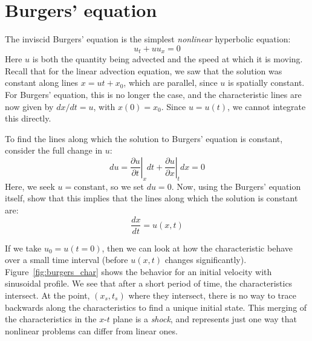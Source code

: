 

\section{Burgers' equation}

The inviscid Burgers' equation is the simplest {\em nonlinear} hyperbolic
equation:
\begin{equation}
u_t + u u_x = 0
\end{equation}
Here $u$ is both the quantity being advected and the speed at which
it is moving.  Recall that for the linear advection equation, we saw
that the solution was constant along lines $x = ut + x_0$, which are
parallel, since $u$ is spatially constant.  For Burgers' equation,
this is no longer the case, and the characteristic lines are now
given by $dx/dt = u$, with $x(0) = x_0$.  Since $u = u(t)$, we cannot
integrate this directly.

\begin{exercise}
{To find the lines along which the solution to Burgers' equation is
constant, consider the full change in $u$:
\begin{equation}
du = \left . \frac{\partial u}{\partial t} \right |_x dt +
     \left . \frac{\partial u}{\partial x} \right |_t dx = 0
\end{equation}
Here, we seek $u = \mathrm{constant}$, so we set $du = 0$.  Now,
using the Burgers' equation itself, show that this implies that
the lines along which the solution is constant are:
\begin{equation}
\frac{dx}{dt} = u(x,t)
\end{equation}
}
\end{exercise}

If we take $u_0 = u(t=0)$, then we can look at how the characteristic
behave over a small time interval (before $u(x,t)$ changes
significantly).  Figure~\ref{fig:burgers_char} shows the behavior for
an initial velocity with sinusoidal profile.  We see that after a
short period of time, the characteristics intersect.  At the point,
$(x_s, t_s)$ where they intersect, there is no way to trace backwards
along the characteristics to find a unique initial state.  This
merging of the characteristics in the $x$-$t$ plane is a {\em shock}, and
represents just one way that nonlinear problems can differ from linear
ones.

